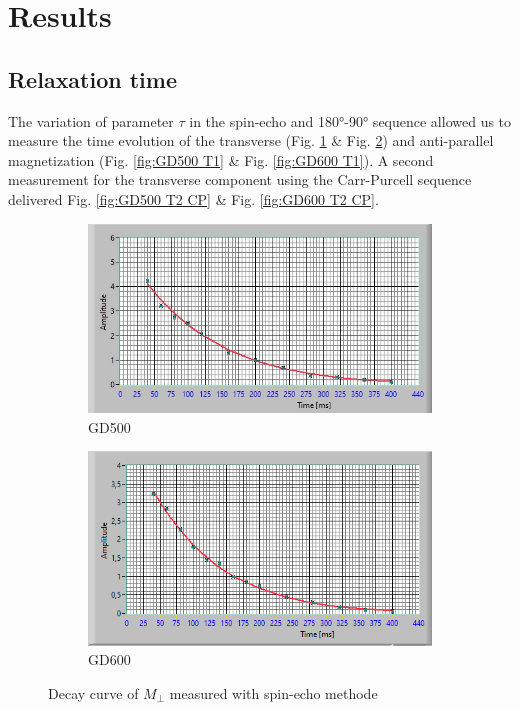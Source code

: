 \section{Results}
\subsection{Relaxation time}
The variation of parameter $\tau$ in the spin-echo and 180°-90° sequence allowed us to measure the time evolution of the transverse 
(Fig. \ref{fig:GD500 T2 Sp} \& Fig. \ref{fig:GD600 T2 Sp})
 and anti-parallel magnetization (Fig. \ref{fig:GD500 T1} \& Fig. \ref{fig:GD600 T1}). A second measurement for the transverse component using the Carr-Purcell sequence delivered Fig. \ref{fig:GD500 T2 CP} \& Fig. \ref{fig:GD600 T2 CP}. 

\begin{figure}[!htbp]
  \centering
  \begin{subfigure}[b]{0.45\textwidth}
    \centering
    \includegraphics[width=\textwidth]{./Protocol images/GD500_T2_sp_fit (1).jpg}
    \caption{GD500}
    \label{fig:GD500 T2 Sp}
  \end{subfigure}
  \hfill
  \begin{subfigure}[b]{0.45\textwidth}
    \centering
    \includegraphics[width=\textwidth]{./Protocol images/GD60_Sp (1).png}
    \caption{GD600}
    \label{fig:GD600 T2 Sp}
  \end{subfigure}
  \caption{Decay curve of $M_\perp$ measured with spin-echo methode}
  \label{fig:subsidebyside}
\end{figure}


